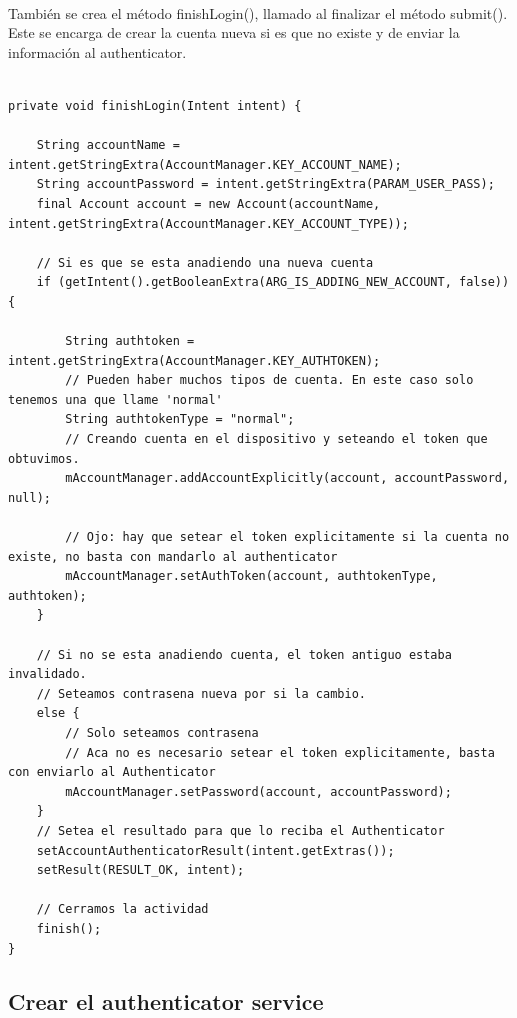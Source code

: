 \documentclass[10pt]{extarticle}
\begin{document}
\paragraph{}
También se crea el método finishLogin(), llamado al finalizar el método submit(). Este se encarga de crear la cuenta nueva si es que no existe y de enviar la información al authenticator.

\begin{lstlisting}

private void finishLogin(Intent intent) {

    String accountName = intent.getStringExtra(AccountManager.KEY_ACCOUNT_NAME);
    String accountPassword = intent.getStringExtra(PARAM_USER_PASS);
    final Account account = new Account(accountName, intent.getStringExtra(AccountManager.KEY_ACCOUNT_TYPE));

    // Si es que se esta anadiendo una nueva cuenta
    if (getIntent().getBooleanExtra(ARG_IS_ADDING_NEW_ACCOUNT, false)) {

        String authtoken = intent.getStringExtra(AccountManager.KEY_AUTHTOKEN);
        // Pueden haber muchos tipos de cuenta. En este caso solo tenemos una que llame 'normal'
        String authtokenType = "normal";
        // Creando cuenta en el dispositivo y seteando el token que obtuvimos.
        mAccountManager.addAccountExplicitly(account, accountPassword, null);

        // Ojo: hay que setear el token explicitamente si la cuenta no existe, no basta con mandarlo al authenticator
        mAccountManager.setAuthToken(account, authtokenType, authtoken);
    }

    // Si no se esta anadiendo cuenta, el token antiguo estaba invalidado.
    // Seteamos contrasena nueva por si la cambio.
    else {
        // Solo seteamos contrasena
        // Aca no es necesario setear el token explicitamente, basta con enviarlo al Authenticator
        mAccountManager.setPassword(account, accountPassword);
    }
    // Setea el resultado para que lo reciba el Authenticator
    setAccountAuthenticatorResult(intent.getExtras());
    setResult(RESULT_OK, intent);

    // Cerramos la actividad
    finish();
}

\end{lstlisting}


\subsection{Crear el authenticator service}
\end{document}

